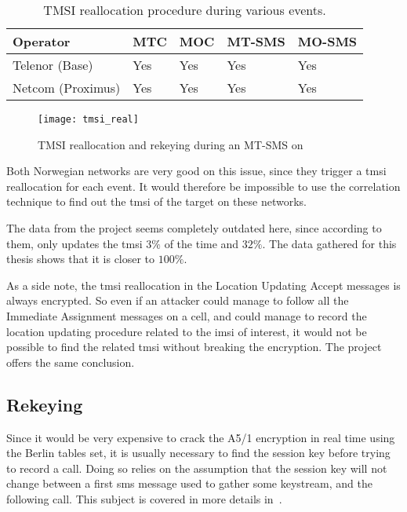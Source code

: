       \begin{table}[h]
        \centering
        \begin{tabular}{@{}lllll@{}}
          \toprule
          Operator          & MTC & MOC & MT-SMS & MO-SMS \\
          \midrule
          Telenor (Base)    & Yes & Yes & Yes    & Yes    \\
          Netcom (Proximus) & Yes & Yes & Yes    & Yes    \\
          \bottomrule
        \end{tabular}
        \caption{TMSI reallocation procedure during various events.}
        \label{tab:events_tmsi_reallocation}
      \end{table}

      \begin{figure}[h]
        \centering
        \texttt{[image: tmsi\_real]}
        \caption{TMSI reallocation and rekeying during an MT-SMS on }
        \label{fig:tmsi_real}
      \end{figure}

      Both Norwegian networks are very good on this issue, since they
      trigger a \gls{tmsi} reallocation for each event. It would
      therefore be impossible to use the correlation technique to find
      out the \gls{tmsi} of the target on these networks.

      The data from the  project seems completely outdated
      here, since according to them,  only updates the
      \gls{tmsi} $3\%$ of the time and  $32\%$. The data
      gathered for this thesis shows that it is closer to $100\%$.

      As a side note, the \gls{tmsi} reallocation in the Location
      Updating Accept messages is always encrypted. So even if an
      attacker could manage to follow all the Immediate Assignment
      messages on a cell, and could manage to record the location
      updating procedure related to the \gls{imsi} of interest, it would
      not be possible to find the related \gls{tmsi} without breaking
      the encryption. The  project offers the same
      conclusion.

    \subsection{Rekeying}

      Since it would be very expensive to crack the A5/1 encryption in
      real time using the Berlin tables set, it is usually necessary to
      find the session key before trying to record a call. Doing so
      relies on the assumption that the session key will not change
      between a first \gls{sms} message used to gather some keystream,
      and the following call. This subject is covered in more details
      in~.

